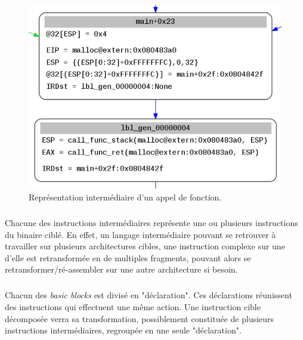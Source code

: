 \begin{figure}[h]
    \centering
    \includegraphics[scale=0.3]{images/ir.png}\newline
    \caption{Représentation intermédiaire d'un appel de fonction.}
\end{figure}
\subparagraph{}
Chacune des instructions intermédiaires représente une ou plusieurs instructions du binaire ciblé. En effet, un langage intermédiaire
pouvant se retrouver à travailler sur plusieurs architectures cibles, une instruction complexe sur une d'elle est retransformée en de multiples
fragments, pouvant alors se retransformer/ré-assembler sur une autre architecture si besoin.
\subparagraph{}
Chacun des \textit{basic blocks} est divisé en "déclaration". Ces déclarations réunissent des instructions qui effectuent une même action. Une instruction cible décomposée
verra sa transformation, possiblement constituée de plusieurs instructions intermédiaires, regroupée en une seule "déclaration".



